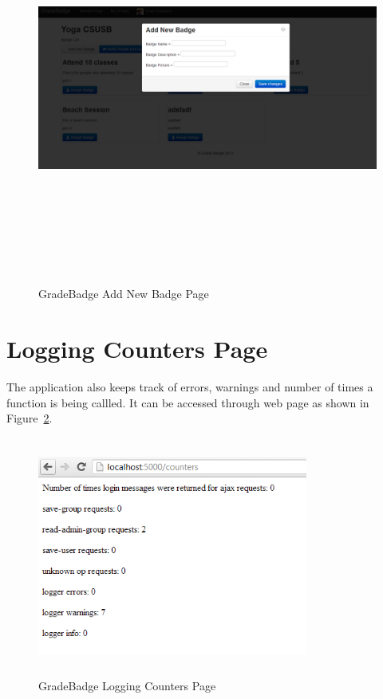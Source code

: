 \vspace{3em}
\begin{figure}[H]
\begin{center}
\includegraphics[height=5.1in,width=6.5in]{images/add-new-badge.png}
\caption{GradeBadge Add New Badge Page}
\label{fig:add-new-badge}
\end{center}
\end{figure}

\newpage
\section{Logging Counters Page}
The application also keeps track of errors, warnings and number of times a function is being callled. It can be accessed through web page as shown in Figure~\ref{fig:counters}. 

\vspace{3em}
\begin{figure}[H]
\begin{center}
\includegraphics[height=3.1in,width=3.5in]{images/counters.png}
\caption{GradeBadge Logging Counters Page}
\label{fig:counters}
\end{center}
\end{figure}

